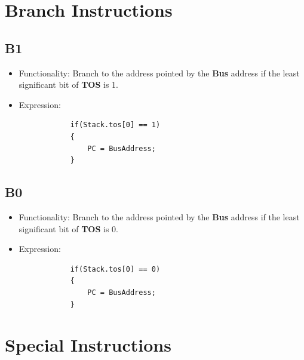 \documentclass[11pt]{report}
\begin{document}
    \section{Branch Instructions}
    \subsection{B1}
    \begin{itemize}
        \item Functionality: Branch to the address pointed by the \textbf{Bus} 
                address if the least significant bit of \textbf{TOS} is 1.
        \item Expression:
        \begin{verbatim}
            if(Stack.tos[0] == 1)
            {
                PC = BusAddress;
            }
        \end{verbatim}
    \end{itemize}

    \subsection{B0}
    \begin{itemize}
        \item Functionality: Branch to the address pointed by the \textbf{Bus} 
                address if the least significant bit of \textbf{TOS} is 0.
        \item Expression:
        \begin{verbatim}
            if(Stack.tos[0] == 0)
            {
                PC = BusAddress;
            }
        \end{verbatim}
    \end{itemize}

    \section{Special Instructions}
\end{document}
